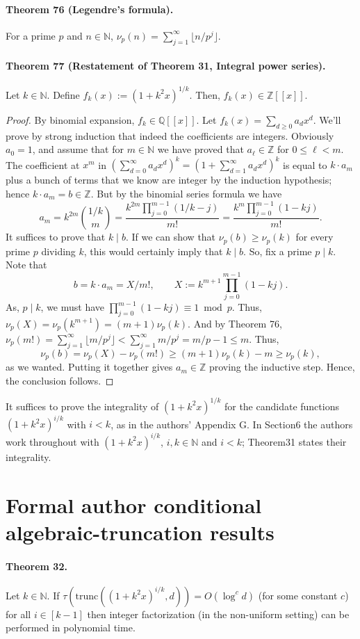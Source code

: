 \documentclass[10pt,a4paper]{article}
\begin{document}
\paragraph{Theorem 76 (Legendre's formula).} For a prime $p$ and $n\in\mathbb N$, $\nu_p(n)=\sum_{j=1}^\infty\lfloor n/p^j\rfloor$.
\paragraph{Theorem 77 (Restatement of Theorem 31, Integral power series).} Let $k\in\mathbb N$. Define $f_k(x):=(1+k^2x)^{1/k}$. Then, $f_k(x)\in\mathbb Z[[x]]$.
\begin{proof}By binomial expansion, $f_k\in\mathbb Q[[x]]$. Let $f_k(x)=\sum_{d\ge0}a_dx^d$. We'll prove by strong induction that indeed the coefficients are integers. Obviously $a_0=1$, and assume that for $m\in\mathbb N$ we have proved that $a_\ell\in\mathbb Z$ for $0\le\ell<m$. The coefficient at $x^m$ in $(\sum_{d=0}^\infty a_dx^d)^k=(1+\sum_{d=1}^\infty a_dx^d)^k$ is equal to $k\cdot a_m$ plus a bunch of terms that we know are integer by the induction hypothesis; hence $k\cdot a_m=b\in\mathbb Z$. But by the binomial series formula we have
\[a_m=k^{2m}\binom{1/k}m=\frac{k^{2m}\prod_{j=0}^{m-1}(1/k-j)}{m!}=\frac{k^m\prod_{j=0}^{m-1}(1-kj)}{m!}.\]
It suffices to prove that $k\mid b$. If we can show that $\nu_p(b)\ge\nu_p(k)$ for every prime $p$ dividing $k$, this would certainly imply that $k\mid b$. So, fix a prime $p\mid k$. Note that
\[b=k\cdot a_m=X/m!,\qquad X:=k^{m+1}\prod_{j=0}^{m-1}(1-kj).\]
As, $p\mid k$, we must have $\prod_{j=0}^{m-1}(1-kj)\equiv1\bmod p$. Thus, $\nu_p(X)=\nu_p(k^{m+1})=(m+1)\nu_p(k)$. And by Theorem 76, $\nu_p(m!)=\sum_{j=1}^\infty\lfloor m/p^j\rfloor<\sum_{j=1}^\infty m/p^j=m/p-1\le m$. Thus,
\[\nu_p(b)=\nu_p(X)-\nu_p(m!)\ge(m+1)\nu_p(k)-m\ge\nu_p(k),\]
as we wanted. Putting it together gives $a_m\in\mathbb Z$ proving the inductive step. Hence, the conclusion follows.\end{proof}
It suffices to prove the integrality of $(1+k^2x)^{1/k}$ for the candidate functions $(1+k^2x)^{i/k}$ with $i<k$, as in the authors' Appendix G. In Section6 the authors work throughout with $(1+k^2x)^{i/k}$, $i,k\in\mathbb N$ and $i<k$; Theorem31 states their integrality.

\section*{Formal author conditional algebraic-truncation results}
\paragraph{Theorem 32.} Let $k\in\mathbb N$. If $\tau(\mathrm{trunc}((1+k^2x)^{i/k},d))=O(\log^cd)$ (for some constant $c$) for all $i\in[k-1]$ then integer factorization (in the non-uniform setting) can be performed in polynomial time.
\end{document}
